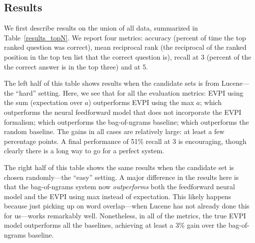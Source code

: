 \documentclass[11pt]{report}
\begin{document}


\subsection{Results}

We first describe results on the union of all data, summarized in Table~\ref{results_topN}.
We report four metrics: accuracy (percent of time the top ranked question was correct),
mean reciprocal rank (the reciprocal of the ranked position in the top ten list that the correct question is), 
recall at 3 (percent of the the correct answer is in the top three) and
at 5.

The left half of this table shows results when the candidate sets is from Lucene---the ``hard'' setting.
Here, we see that for all the evaluation metrics:
EVPI using the sum (expectation over $a$) outperforms
EVPI using the max $a$;
which outperforms the neural feedforward model that does not incorporate the EVPI formalism;
which outperforms the bag-of-ngrams baseline;
which outperforms the random baseline.
The gains in all cases are relatively large: at least a few percentage points.
A final performance of 51\% recall at 3 is encouraging, though clearly there is a long way to go for a perfect system.

The right half of this table shows the same results when the candidate set is chosen randomly---the ``easy'' setting.
A major difference in the results here is that the bag-of-ngrams system now \emph{outperforms} both the feedforward neural model and the EVPI using max instead of expectation.
This likely happens because just picking up on word overlap---when Lucene has not already done this for us---works remarkably well.
Nonetheless, in all of the metrics, the true EVPI model outperforms all the baselines, achieving at least a 3\% gain over the bag-of-ngrams baseline.
\end{document}
